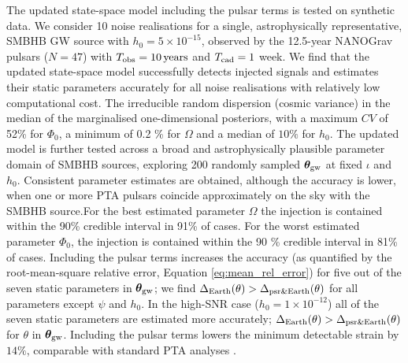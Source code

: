 \documentclass[fleqn,usenatbib,useAMS]{mnras}
\begin{document}
The updated state-space model including the pulsar terms is tested on synthetic data. We consider 10 noise realisations for a single, astrophysically representative, SMBHB GW source with $h_0 = 5 \times 10^{-15}$, observed by the 12.5-year NANOGrav pulsars ($N=47$) with $T_{\rm obs} = 10 \, {\rm years}$ and $T_{\rm cad} = 1$ week. We find that the updated state-space model successfully detects injected signals and estimates their static parameters accurately for all noise realisations with relatively low computational cost. The irreducible random dispersion (cosmic variance) in the median of the marginalised one-dimensional posteriors, with a maximum $CV$ of 52\% for $\Phi_0$, a minimum of 0.2 \% for $\Omega$ and a median of $10 \%$ for $h_0$. The updated model is further tested across a broad and astrophysically plausible parameter domain of SMBHB sources, exploring 200 randomly sampled $\boldsymbol{\theta}_{\rm gw}$ at fixed $\iota$ and $h_0$. Consistent parameter estimates are obtained, although the accuracy is lower, when one or more PTA pulsars coincide approximately on the sky with the SMBHB source.For the best estimated parameter $\Omega$ the injection is contained within the 90\% credible interval in 91\% of cases. For the worst estimated parameter $\Phi_0$, the injection is contained within the 90 \% credible interval in 81\% of cases. Including the pulsar terms increases the accuracy (as quantified by the root-mean-square relative error, Equation \eqref{eq:mean_rel_error}) for five out of the seven static parameters in $\boldsymbol{\theta}_{\rm gw}$; we find $\Delta_{\rm Earth}(\theta) > \Delta_{\rm psr \& Earth}(\theta)$ for all parameters except $\psi$ and $h_0$. In the high-SNR case ($h_0 = 1 \times 10^{-12}$) all of the seven static parameters are estimated more accurately; $\Delta_{\rm Earth}(\theta) > \Delta_{\rm psr \& Earth}(\theta)$ for $\theta$ in $\boldsymbol{\theta}_{\rm gw}$. Including the pulsar terms lowers the minimum detectable strain by $14\%$, comparable with standard PTA analyses \citep[e.g.][]{Zhupulsarterms}. \newline 
\end{document}

